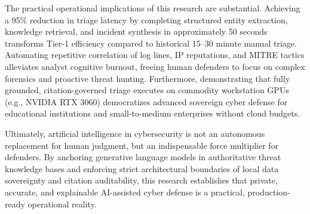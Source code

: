 The practical operational implications of this research are substantial. Achieving a 95\% reduction in triage latency by completing structured entity extraction, knowledge retrieval, and incident synthesis in approximately 50 seconds transforms Tier-1 efficiency compared to historical 15--30 minute manual triage. Automating repetitive correlation of log lines, IP reputations, and MITRE tactics alleviates analyst cognitive burnout, freeing human defenders to focus on complex forensics and proactive threat hunting. Furthermore, demonstrating that fully grounded, citation-governed triage executes on commodity workstation GPUs (e.g., NVIDIA RTX 3060) democratizes advanced sovereign cyber defense for educational institutions and small-to-medium enterprises without cloud budgets.

Ultimately, artificial intelligence in cybersecurity is not an autonomous replacement for human judgment, but an indispensable force multiplier for defenders. By anchoring generative language models in authoritative threat knowledge bases and enforcing strict architectural boundaries of local data sovereignty and citation auditability, this research establishes that private, accurate, and explainable AI-assisted cyber defense is a practical, production-ready operational reality.
